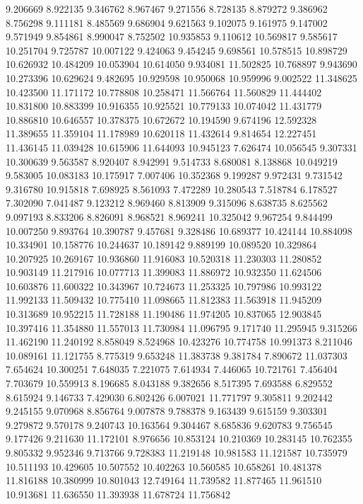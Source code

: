 9.206669
8.922135
9.346762
8.967467
9.271556
8.728135
8.879272
9.386962
8.756298
9.111181
8.485569
9.686904
9.621563
9.102075
9.161975
9.147002
9.571949
9.854861
8.990047
8.752502
10.935853
9.110612
10.569817
9.585617
10.251704
9.725787
10.007122
9.424063
9.454245
9.698561
10.578515
10.898729
10.626932
10.484209
10.053904
10.614050
9.934081
11.502825
10.768897
9.943690
10.273396
10.629624
9.482695
10.929598
10.950068
10.959996
9.002522
11.348625
10.423500
11.171172
10.778808
10.258471
11.566764
11.560829
11.444402
10.831800
10.883399
10.916355
10.925521
10.779133
10.074042
11.431779
10.886810
10.646557
10.378375
10.672672
10.194590
9.674196
12.592328
11.389655
11.359104
11.178989
10.620118
11.432614
9.814654
12.227451
11.436145
11.039428
10.615906
11.644093
10.945123
7.626474
10.056545
9.307331
10.300639
9.563587
8.920407
8.942991
9.514733
8.680081
8.138868
10.049219
9.583005
10.083183
10.175917
7.007406
10.352368
9.199287
9.972431
9.731542
9.316780
10.915818
7.698925
8.561093
7.472289
10.280543
7.518784
6.178527
7.302090
7.041487
9.123212
8.969460
8.813909
9.315096
8.638735
8.625562
9.097193
8.833206
8.826091
8.968521
8.969241
10.325042
9.967254
9.844499
10.007250
9.893764
10.390787
9.457681
9.328486
10.689377
10.424144
10.884098
10.334901
10.158776
10.244637
10.189142
9.889199
10.089520
10.329864
10.207925
10.269167
10.936860
11.916083
10.520318
11.230303
11.280852
10.903149
11.217916
10.077713
11.399083
11.886972
10.932350
11.624506
10.603876
11.600322
10.343967
10.724673
11.253325
10.797986
10.993122
11.992133
11.509432
10.775410
11.098665
11.812383
11.563918
11.945209
10.313689
10.952215
11.728188
11.190486
11.974205
10.837065
12.903845
10.397416
11.354880
11.557013
11.730984
11.096795
9.171740
11.295945
9.315266
11.462190
11.240192
8.858049
8.524968
10.423276
10.774758
10.991373
8.211046
10.089161
11.121755
8.775319
9.653248
11.383738
9.381784
7.890672
11.037303
7.654624
10.300251
7.648035
7.221075
7.614934
7.446065
10.721761
7.456404
7.703679
10.559913
8.196685
8.043188
9.382656
8.517395
7.693588
6.829552
8.615924
9.146733
7.429030
6.802426
6.007021
11.771797
9.305811
9.202442
9.245155
9.070968
8.856764
9.007878
9.788378
9.163439
9.615159
9.303301
9.279872
9.570178
9.240743
10.163564
9.304467
8.685836
9.620783
9.756545
9.177426
9.211630
11.172101
8.976656
10.853124
10.210369
10.283145
10.762355
9.805332
9.952346
9.713766
9.728383
11.219148
10.981583
11.121587
10.735979
10.511193
10.429605
10.507552
10.402263
10.560585
10.658261
10.481378
11.816188
10.380999
10.801043
12.749164
11.739582
11.877465
11.961510
10.913681
11.636550
11.393938
11.678724
11.756842
